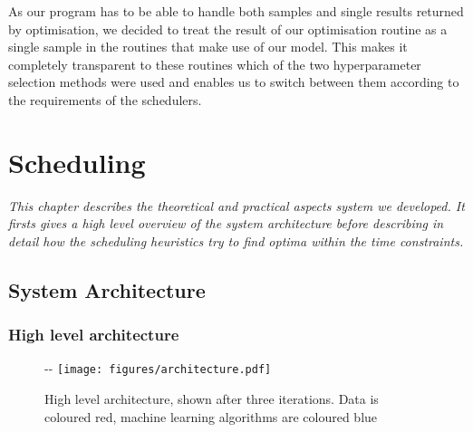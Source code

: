 \documentclass[a4paper,12pt,twoside,openright]{report}
\begin{document}
As our program has to be able to handle both samples and single results returned by optimisation, we decided to treat the result of our optimisation routine as a single sample in the routines that make use of our model. This makes it completely transparent to these routines which of the two hyperparameter selection methods were used and enables us to switch between them according to the requirements of the schedulers.



\chapter{Scheduling} 


\textit{This chapter describes the theoretical and practical aspects system we developed. It firsts gives a high level overview of the system architecture before describing in detail how the scheduling heuristics try to find optima within the time constraints.}

\section{System Architecture} %



\subsection{High level architecture}
\begin{figure}[!ht]
  \begin{adjustwidth}{-\oddsidemargin-2in}{-\rightmargin-1.5in}
    \centering
    \texttt{[image: figures/architecture.pdf]}
    
  \end{adjustwidth}
  \caption{High level architecture, shown after three iterations. Data is coloured red, machine learning algorithms are coloured blue}
    \label{architecture}
\end{figure}
\end{document}
